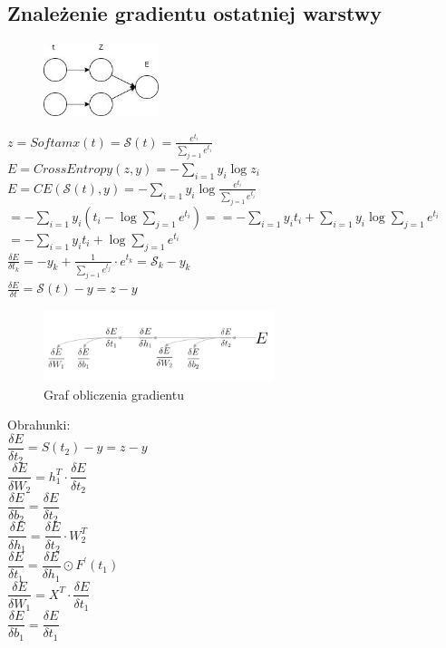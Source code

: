\documentclass{article}
\begin{document}
\subsection{Znależenie gradientu ostatniej warstwy}
\begin{figure}[H]
	\centering
	\includegraphics[width=0.3\textwidth,keepaspectratio=true]{feed_forward_error}
	\caption{}
	\label{feed_forward_error}
\end{figure}

$z = Softamx(t) = \mathcal{S}(t)= \frac{e^{t_i}}{\sum_{j=1}e^{t_i}}$ \\
$E = CrossEntropy(z, y) = -\sum_{i=1}y_i\log z_i$\\
$E = CE(\mathcal{S}(t),y)=-\sum_{i=1}y_i\log\frac{e^{t_i}}{\sum_{j=1}e^{t_i}}$\\
$= -\sum_{i=1}y_i(t_i-\log \sum_{j=1}e^{t_i}) = = -\sum_{i=1}y_it_i + \sum_{i=1}y_i\log\sum_{j=1}e^{t_i}$\\
$= -\sum_{i=1}y_it_i + \log\sum_{j=1}e^{t_i}$\\
$\frac{\delta E}{\delta t_k} = -y_k + \frac{1}{\sum_{j=1}e^{t_j}}\cdot e^{t_k} = \mathcal{S}_k - y_k$\\
$\frac{\delta E}{\delta t} = \mathcal{S}(t) - y = z - y$

\begin{figure}[H]
	\centering
	\includegraphics[width=0.6\textwidth,keepaspectratio=true]{gradient_graph}
	\caption{Graf obliczenia gradientu}
	\label{gradien_graph}
\end{figure}

\begin{flushleft}
Obrahunki:\\
$\dfrac{\delta E}{\delta t_2} = S(t_2)-y=z-y$\\
\vspace{5mm}
$\dfrac{\delta E}{\delta W_2} = h_1^T \cdot \dfrac{\delta E}{\delta t_2}$\\
$\dfrac{\delta E}{\delta b_2} = \dfrac{\delta E}{\delta t_2}$\\
\vspace{5mm}
$\dfrac{\delta E}{\delta h_1} = \dfrac{\delta E}{\delta t_2} \cdot W_2^T$\\
$\dfrac{\delta E}{\delta t_1} = \dfrac{\delta E}{\delta h_1} \odot F^\prime (t_1)$\\
\vspace{5mm}
$\dfrac{\delta E}{\delta W_1} = X^T \cdot \dfrac{\delta E}{\delta t_1}$\\
$\dfrac{\delta E}{\delta b_1} = \dfrac{\delta E}{\delta t_1}$
\end{flushleft}
\end{document}
